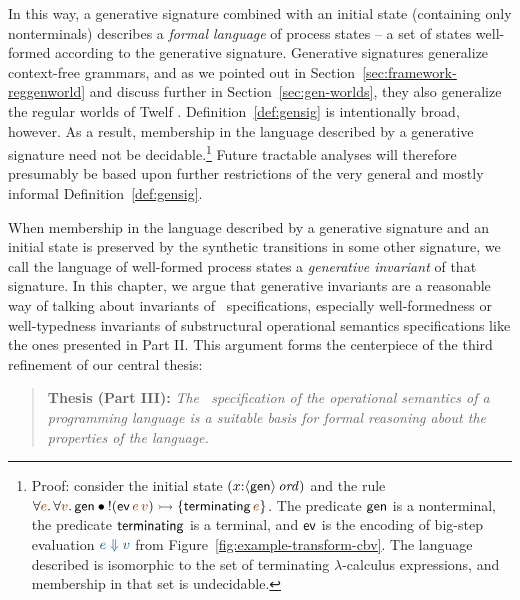 In this way, a generative signature combined with an initial state
(containing only nonterminals) describes a {\it formal language} of
process states -- a set of states well-formed according to the
generative signature. Generative signatures generalize context-free
grammars, and as we pointed out in
Section~\ref{sec:framework-reggenworld} and discuss further in
Section~\ref{sec:gen-worlds}, they also generalize the regular worlds
of Twelf \cite{schurmann00automating}. Definition~\ref{def:gensig} is
intentionally broad, however. As a result, membership in the language
described by a generative signature need not be
decidable.\footnote{Proof: consider the initial state
  $(x{:}{\langle {\sf gen} \rangle}\,{{\it ord}})$ and the rule $\forall
  \lf{e}.\,\forall\lf{v}.\,{\sf gen} \fuse {!}({\sf
    ev}\,\lf{e}\,\lf{v}) \lefti \{ {\sf terminating}\,\lf{e} \}$. The
  predicate ${\sf gen}$ is a nonterminal, the predicate ${\sf
    terminating}$ is a terminal, and ${\sf ev}$ is the encoding of
  big-step evaluation $\obj{e \Downarrow v}$ from
  Figure~\ref{fig:example-transform-cbv}.  The language described is
  isomorphic to the set of terminating $\lambda$-calculus expressions,
  and membership in that set is undecidable.} Future tractable analyses
will therefore presumably be based upon further restrictions of the
very general and mostly informal Definition~\ref{def:gensig}.

When membership in the language described by a generative signature
and an initial state is preserved by the synthetic transitions in some
other signature, we call the language of well-formed process states a
{\it generative invariant} of that signature.  In this chapter, we
argue that generative invariants are a reasonable way of talking about
invariants of \sls~specifications, especially well-formedness or
well-typedness invariants of substructural operational semantics
specifications like the ones presented in Part II. This argument forms
the centerpiece of the third refinement of our central thesis:

\smallskip
\begin{quote} 
  {\bf Thesis (Part III):} {\it The \sls~specification of the operational
    semantics of a programming language is a suitable basis for formal
    reasoning about the properties of the language.}
\end{quote} 
\smallskip 

